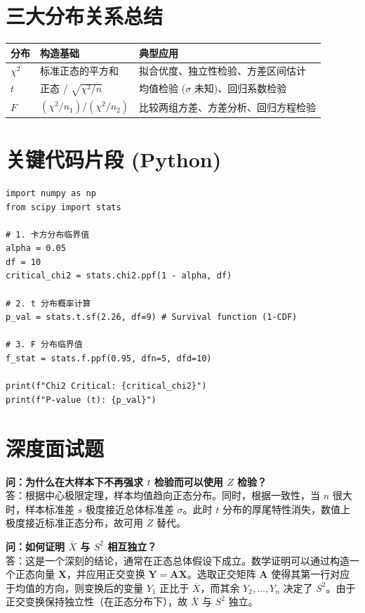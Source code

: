 \documentclass[12pt, a4paper]{article}
\begin{document}
\section{三大分布关系总结}
\begin{table}[h]
\centering
\begin{tabularx}{\textwidth}{|l|X|X|}
\hline
\textbf{分布} & \textbf{构造基础} & \textbf{典型应用} \\
\hline
$\chi^2$ & 标准正态的平方和 & 拟合优度、独立性检验、方差区间估计 \\
\hline
$t$ & 正态 / $\sqrt{\chi^2/n}$ & 均值检验 ($\sigma$ 未知)、回归系数检验 \\
\hline
$F$ & $(\chi^2/n_1) / (\chi^2/n_2)$ & 比较两组方差、方差分析、回归方程检验 \\
\hline
\end{tabularx}
\end{table}

\section{关键代码片段 (Python)}
\begin{lstlisting}
import numpy as np
from scipy import stats

# 1. 卡方分布临界值
alpha = 0.05
df = 10
critical_chi2 = stats.chi2.ppf(1 - alpha, df)

# 2. t 分布概率计算
p_val = stats.t.sf(2.26, df=9) # Survival function (1-CDF)

# 3. F 分布临界值
f_stat = stats.f.ppf(0.95, dfn=5, dfd=10)

print(f"Chi2 Critical: {critical_chi2}")
print(f"P-value (t): {p_val}")
\end{lstlisting}

\section{深度面试题}

\textbf{问：为什么在大样本下不再强求 $t$ 检验而可以使用 $Z$ 检验？}\\
答：根据中心极限定理，样本均值趋向正态分布。同时，根据一致性，当 $n$ 很大时，样本标准差 $s$ 极度接近总体标准差 $\sigma$。此时 $t$ 分布的厚尾特性消失，数值上极度接近标准正态分布，故可用 $Z$ 替代。

\textbf{问：如何证明 $\bar{X}$ 与 $S^2$ 相互独立？}\\
答：这是一个深刻的结论，通常在正态总体假设下成立。数学证明可以通过构造一个正态向量 $\mathbf{X}$，并应用正交变换 $\mathbf{Y} = \mathbf{A}\mathbf{X}$。选取正交矩阵 $\mathbf{A}$ 使得其第一行对应于均值的方向，则变换后的变量 $Y_1$ 正比于 $\bar{X}$，而其余 $Y_2, \dots, Y_n$ 决定了 $S^2$。由于正交变换保持独立性（在正态分布下），故 $\bar{X}$ 与 $S^2$ 独立。
\end{document}
